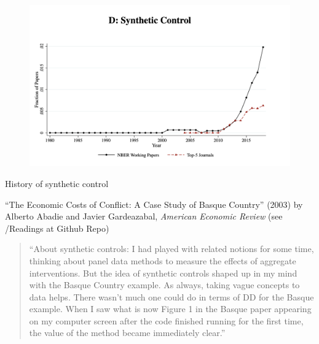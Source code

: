 \documentclass{beamer}
\begin{document}
\begin{frame}[plain]
	\begin{figure}
	\includegraphics[scale=0.25]{./lecture_includes/currie_synth.png}
	\end{figure}
\end{frame}

\begin{frame}{History of synthetic control}

 
``The Economic Costs of Conflict: A Case Study of Basque Country'' (2003) by Alberto Abadie and Javier Gardeazabal, \emph{American Economic Review} (see /Readings at Github Repo)

\bigskip
\footnotesize
\begin{quote} ``About synthetic controls: I had played with related notions for some time, thinking about panel data methods to measure the effects of aggregate interventions. But the idea of synthetic controls shaped up in my mind with the Basque Country example. As always, taking vague concepts to data helps. There wasn’t much one could do in terms of DD for the Basque example. When I saw what is now Figure 1 in the Basque paper appearing on my computer screen after the code finished running for the first time, the value of the method became immediately clear.''
\end{quote}


\end{frame}
\end{document}
